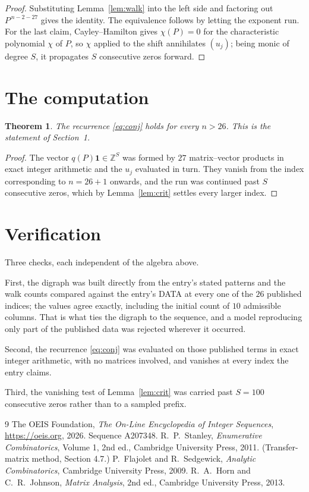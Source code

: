 \documentclass[11pt,a4paper]{article}
\theoremstyle{plain}
\newtheorem{theorem}{Theorem}
\theoremstyle{definition}
\begin{document}
\begin{proof}
Substituting Lemma~\ref{lem:walk} into the left side and factoring out
$P^{\,n-2-27}$ gives the identity. The equivalence follows by letting the exponent
run. For the last claim, Cayley--Hamilton gives $\chi(P)=0$ for the characteristic
polynomial $\chi$ of $P$, so $\chi$ applied to the shift annihilates $(u_j)$; being monic of
degree $S$, it propagates $S$ consecutive zeros forward.
\end{proof}

\section{The computation}

\begin{theorem}
The recurrence \eqref{eq:conj} holds for every $n>26$. This is the statement of
Section~1.
\end{theorem}

\begin{proof}
The vector $q(P)\mathbf{1}\in\mathbb{Z}^{S}$ was formed by $27$ matrix--vector
products in exact integer arithmetic and the $u_j$ evaluated in turn. They vanish from the
index corresponding to $n=26+1$ onwards, and the run was continued past $S$ consecutive
zeros, which by Lemma~\ref{lem:crit} settles every larger index.
\end{proof}

\section{Verification}

Three checks, each independent of the algebra above.

First, the digraph was built directly from the entry's stated patterns and the walk counts
compared against the entry's DATA at every one of the $26$ published indices; the
values agree exactly, including the initial count of $10$ admissible columns. That is
what ties the digraph to the sequence, and a model reproducing only part of the published
data was rejected wherever it occurred.

Second, the recurrence \eqref{eq:conj} was evaluated on those published terms in exact
integer arithmetic, with no matrices involved, and vanishes at every index the entry claims.

Third, the vanishing test of Lemma~\ref{lem:crit} was carried past $S=100$ consecutive
zeros rather than to a sampled prefix.

\begin{thebibliography}{9}
 The OEIS Foundation, \emph{The On-Line Encyclopedia of Integer
Sequences}, \url{https://oeis.org}, 2026. Sequence A207348.
 R.~P.~Stanley, \emph{Enumerative Combinatorics}, Volume 1, 2nd ed.,
Cambridge University Press, 2011. (Transfer-matrix method, Section 4.7.)
 P.~Flajolet and R.~Sedgewick, \emph{Analytic Combinatorics}, Cambridge
University Press, 2009.
 R.~A.~Horn and C.~R.~Johnson, \emph{Matrix Analysis}, 2nd ed., Cambridge
University Press, 2013.
\end{thebibliography}
\end{document}
